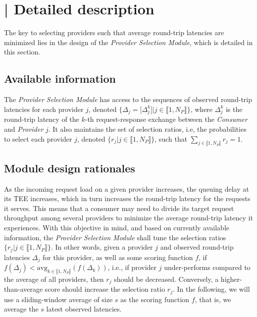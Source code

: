 \section{\sysname\space | Detailed description}\label{sec:solution}

The key to selecting providers such that average round-trip latencies are minimized lies in the design of the \emph{Provider Selection Module}, which is detailed in this section.

\subsection{Available information}

The \emph{Provider Selection Module} has access to the sequences of observed round-trip latencies for each provider $j$, denoted $\{\Delta_{j}=\lbrack \Delta_{j}^{k}\rbrack | j\in\llbracket 1, N_{P}\rrbracket\}$, where $\Delta_{j}^{k}$ is the round-trip latency of the $k$-th request-response exchange between the \emph{Consumer} and \emph{Provider} $j$.
It also maintains the set of selection ratios, i.e, the probabilities to select each provider $j$, denoted $\{ r_{j} | j\in\llbracket 1, N_{P}\rrbracket\}$, such that $\sum_{j\in \llbracket 1,N_{P}\rrbracket}r_{j}=1$.

\subsection{Module design rationales}

As the incoming request load on a given provider increases, the queuing delay at its TEE increases, which in turn increases the round-trip latency for the requests it serves.
This means that a consumer may need to divide its target request throughput among several providers to minimize the average round-trip latency it experiences.
With this objective in mind, and based on currently available information, the \emph{Provider Selection Module} shall tune the selection ratios $\{ r_{j} | j\in\llbracket 1, N_{P}\rrbracket\}$.
In other words, given a provider $j$ and observed round-trip latencies $\Delta_{j}$ for this provider, as well as some scoring function $f$, if $f(\Delta_{j})<\text{avg}_{k\in \llbracket 1,N_{P}\rrbracket}(f(\Delta_{k}))$, i.e., if provider $j$ under-performs compared to the average of all providers, then $r_{j}$ should be decreased. 
Conversely, a higher-than-average score should increase the selection ratio $r_{j}$.
In the following, we will use a sliding-window average of size $s$ as the scoring function $f$, that is, we average the $s$ latest observed latencies. 

